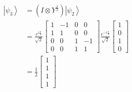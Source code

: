 \documentclass[main.tex]{subfiles}
\begin{document}
\begin{enumerate}
\begin{enumerate}
\begin{align*}
        \left|\psi_{3}\right\rangle & = \left(I \otimes Y^{\frac{1}{2}}\right)\left|\psi_{2}\right\rangle\\
                                    & = \frac{e^{i \frac{\pi}{4}}}{\sqrt{2}} 
                                    \left[\begin{array}{llll}
                                    1 & -1 & 0 & 0 \\
                                    1 & 1 & 0 & 0 \\
                                    0 & 0 & 1 & -1 \\
                                    0 & 0 & 1 & 1
                                    \end{array}\right]
                                    \frac{e^{-i \frac{\pi}{4}}}{\sqrt{2}}
                                    \left[\begin{array}{l}1\\0\\1\\0\end{array}\right]\\ 
                                    & = \frac{1}{2} \left[\begin{array}{l}1\\1\\1\\1\end{array}\right]\\ 
    \end{align*}
\end{enumerate}


\end{enumerate}
\end{document}
